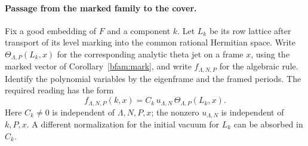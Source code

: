 \paragraph{Passage from the marked family to the cover.}
Fix a good embedding of \(F\) and a component
\(k\). Let \(L_k\) be its row lattice after transport of its level
marking into the common rational Hermitian space. Write
\(\Theta_{\Lambda,P}(L_k,x)\) for the corresponding analytic
theta jet on a frame \(x\), using the marked vector of
Corollary~\ref{bfam:mark}, and write \(f_{\Lambda,N,P}\) for the
algebraic rule. Identify the polynomial variables by the
eigenframe and the framed periods. The required reading has the form
\begin{equation}\label{bfam:reading}
  f_{\Lambda,N,P}(k,x)=C_k\,u_{\Lambda,N}\,
                   \Theta_{\Lambda,P}(L_k,x).
\end{equation}
Here \(C_k\ne0\) is independent of \(\Lambda,N,P,x\); the
nonzero \(u_{\Lambda,N}\) is independent of \(k,P,x\).
A different normalization for the initial vacuum for \(L_k\)
can be absorbed in \(C_k\).

